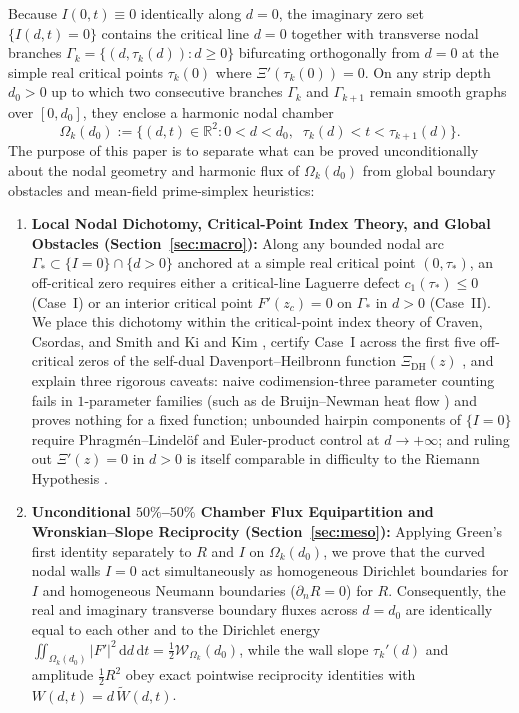 \documentclass[11pt,reqno]{amsart}
\theoremstyle{definition}
\theoremstyle{remark}
\numberwithin{equation}{section}
\newcommand{\dd}{\mathrm{d}}
\newcommand{\DHf}{\mathrm{DH}}
\begin{document}
Because $I(0,t) \equiv 0$ identically along $d=0$, the imaginary zero set $\{I(d,t)=0\}$ contains the critical line $d=0$ together with transverse nodal branches $\Gamma_k = \{(d,\tau_k(d)) : d \ge 0\}$ bifurcating orthogonally from $d=0$ at the simple real critical points $\tau_k(0)$ where $\Xi'(\tau_k(0))=0$. On any strip depth $d_0 > 0$ up to which two consecutive branches $\Gamma_k$ and $\Gamma_{k+1}$ remain smooth graphs over $[0,d_0]$, they enclose a harmonic nodal chamber
\[
\Omega_k(d_0) := \bigl\{(d,t) \in \mathbb{R}^2 : 0 < d < d_0,\;\; \tau_k(d) < t < \tau_{k+1}(d)\bigr\}.
\]
The purpose of this paper is to separate what can be proved unconditionally about the nodal geometry and harmonic flux of $\Omega_k(d_0)$ from global boundary obstacles and mean-field prime-simplex heuristics:
\begin{enumerate}[label=(\roman*),leftmargin=2.2em]
\item \textbf{Local Nodal Dichotomy, Critical-Point Index Theory, and Global Obstacles (Section~\ref{sec:macro}):} Along any bounded nodal arc $\Gamma_* \subset \{I=0\}\cap\{d>0\}$ anchored at a simple real critical point $(0,\tau_*)$, an off-critical zero requires either a critical-line Laguerre defect $c_1(\tau_*) \le 0$ (Case~I) or an interior critical point $F'(z_c)=0$ on $\Gamma_*$ in $d>0$ (Case~II). We place this dichotomy within the critical-point index theory of Craven, Csordas, and Smith \cite{CravenCsordasSmith1987} and Ki and Kim \cite{KiKim2000}, certify Case~I across the first five off-critical zeros of the self-dual Davenport--Heilbronn function $\Xi_{\DHf}(z)$ \cite{DavenportHeilbronn1936}, and explain three rigorous caveats: naive codimension-three parameter counting fails in $1$-parameter families (such as de Bruijn--Newman heat flow \cite{Newman1976,RodgersTao2020}) and proves nothing for a fixed function; unbounded hairpin components of $\{I=0\}$ require Phragm\'{e}n--Lindel\"{o}f and Euler-product control at $d \to +\infty$; and ruling out $\Xi'(z)=0$ in $d>0$ is itself comparable in difficulty to the Riemann Hypothesis \cite{Speiser1934}.
\item \textbf{Unconditional $50\%$--$50\%$ Chamber Flux Equipartition and Wronskian--Slope Reciprocity (Section~\ref{sec:meso}):} Applying Green's first identity separately to $R$ and $I$ on $\Omega_k(d_0)$, we prove that the curved nodal walls $I=0$ act simultaneously as homogeneous Dirichlet boundaries for $I$ and homogeneous Neumann boundaries ($\partial_n R = 0$) for $R$. Consequently, the real and imaginary transverse boundary fluxes across $d=d_0$ are identically equal to each other and to the Dirichlet energy $\iint_{\Omega_k(d_0)}|F'|^2\,\dd d\,\dd t = \frac{1}{2}\mathcal{W}_{\Omega_k}(d_0)$, while the wall slope $\tau_k'(d)$ and amplitude $\frac{1}{2}R^2$ obey exact pointwise reciprocity identities with $W(d,t) = d\,\widetilde{W}(d,t)$.

\end{enumerate}
\end{document}
